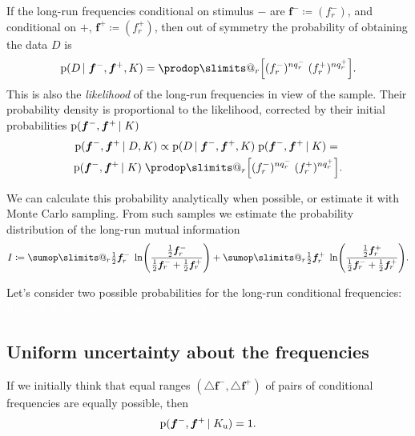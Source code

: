 \documentclass[\ifafour a4paper,12pt,\else a5paper,10pt,\fi%
onecolumn,oneside,article,%
british%
]{memoir}
\makeatletter
\theoremstyle{remark}
\theoremstyle{innote}
\def\sum{\DOTSI\sumop\slimits@}
\def\prod{\DOTSI\prodop\slimits@}
\newcommand*{\incr}{\triangle}%
\newcommand*{\defd}{\coloneqq}
\newcommand*{\pf}{\mathrm{p}}%
\renewcommand*{\|}{\nonscript\,\vert\nonscript\;\mathopen{}}
\newcommand*{\ym}{\mathord{-}}
\newcommand*{\yp}{\mathord{+}}
\newcommand*{\yfm}{f^{-}}
\newcommand*{\yfp}{f^{+}}
\newcommand*{\yfvm}{\bm{f}^{-}}
\newcommand*{\yfvp}{\bm{f}^{+}}
\newcommand*{\yqm}{q^{-}}
\newcommand*{\yqp}{q^{+}}
\newcommand*{\yI}{K}
\newcommand*{\yIu}{K_{\text{u}}}
\makeatother
\begin{document}
If the long-run frequencies conditional on stimulus $\ym$ are
$\yfvm \defd (\yfm_r)$, and conditional on $\yp$, $\yfvp \defd (\yfp_r)$,
then out of symmetry the probability of obtaining the data $D$ is
\begin{equation}
  \label{eq:prob_data_from_freqs}
  \pf(D \| \yfvm, \yfvp, \yI) =
  \prod_r \Bigl[  (\yfm_r)^{n\yqm_r}\;  (\yfp_r)^{n\yqp_r}\Bigr].
\end{equation}
This is also the \emph{likelihood} of the long-run frequencies in view of
the sample. Their probability density is proportional to the likelihood,
corrected by their initial probabilities $\pf(\yfvm, \yfvp \| \yI)$
\begin{multline}
  \label{eq:prob_freqs_from_data}
  \pf(\yfvm, \yfvp \| D, \yI) \propto
  \pf(D \| \yfvm, \yfvp, \yI) \; \pf(\yfvm, \yfvp \| \yI) ={}\\
  \pf(\yfvm, \yfvp \| \yI)\;
  \prod_r \Bigl[  (\yfm_r)^{n\yqm_r}\;  (\yfp_r)^{n\yqp_r}\Bigr].
\end{multline}

We can calculate this probability analytically when possible, or estimate
it with Monte Carlo sampling. From such samples we estimate the probability
distribution of the long-run mutual information
\begin{equation}
  \label{eq:mutual_info}
  I \defd \sum_r \tfrac{1}{2}\yfvm_r\;
  \ln\Biggl(\frac{\frac{1}{2}\yfvm_r}{
    \frac{1}{2}\yfvm_r + \frac{1}{2}\yfvp_r}
  \Biggr) +
  \sum_r \tfrac{1}{2}\yfvp_r\;
  \ln\Biggl(\frac{\frac{1}{2}\yfvp_r}{
    \frac{1}{2}\yfvm_r + \frac{1}{2}\yfvp_r}
  \Biggr).
\end{equation}

Let's consider two possible probabilities for the long-run conditional
frequencies: \textcolor{white}{If you find this you can claim a postcard from me.}


\subsection{Uniform uncertainty about the frequencies}
\label{sec:credib_unif}

If we initially think that equal ranges $(\incr\yfvm, \incr\yfvp)$ of pairs
of conditional frequencies are equally possible, then
\begin{equation}
  \label{eq:credib_unif}
    \pf(\yfvm, \yfvp \| \yIu) = 1.
\end{equation}
\end{document}
